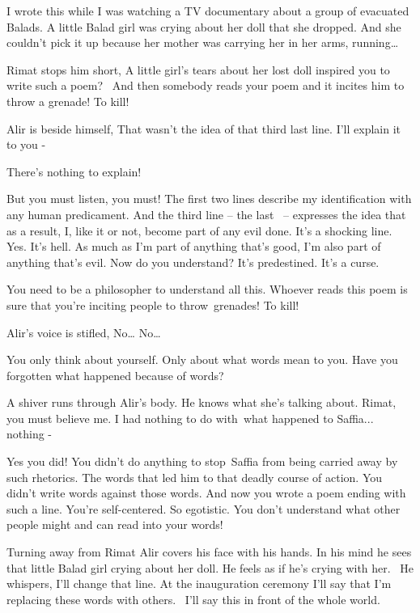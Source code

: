 \documentclass[letterpaper]{article}
\begin{document}
{\textquotedbl}I wrote this while I was watching a TV documentary about a group of evacuated Balads. A little Balad girl
was crying about her doll that she dropped. And she couldn't pick it up because her mother was carrying her in her
arms, running{\dots}{\textquotedbl} 

Rimat stops him short, {\textquotedbl}A little girl's tears about her lost doll inspired you to write such a poem?~ And
then somebody reads your poem and it incites him to throw a grenade! To kill!{\textquotedbl} 

Alir is beside himself, {\textquotedbl}That wasn't the idea of that third last line. I'll explain it to you
-{\textquotedbl} 

{\textquotedbl}There's nothing to explain!{\textquotedbl} 

{\textquotedbl}But you must listen, you must! The first two lines describe my identification with any human predicament.
And the third line -- the last \ {}-- expresses the idea that as a result, I, like it or not, become part of any evil
done. It's a shocking line. Yes. It's hell. As much as I'm part of anything that's good, I'm also part of anything
that's evil. Now do you understand? It's predestined. It's a curse.{\textquotedbl} 

{\textquotedbl}You need to be a philosopher to understand all this. Whoever reads this poem is sure that you're inciting
people to throw~grenades! To kill!{\textquotedbl} 

Alir's voice is stifled, {\textquotedbl}No{\dots} No{\dots}{\textquotedbl} 

{\textquotedbl}You only think about yourself. Only about what words mean to you. Have you forgotten what happened
because of words?{\textquotedbl}

A shiver runs through Alir's body. He knows what she's talking about. {\textquotedbl}Rimat, you must believe me. I had
nothing to do with~what happened to Saffia... nothing - {\textquotedbl} 

{\textquotedbl}Yes you did! You didn't do anything to stop~Saffia from being carried away by such rhetorics. The words
that led him to that deadly course of action. You didn't write words against those words. And now you wrote a poem
ending with such a line. You're self-centered. So egotistic.\textcolor[rgb]{0.8901961,0.42352942,0.039215688}{ }You
don't understand what other people might and can read into your words!{\textquotedbl} 

Turning away from Rimat Alir covers his face with his hands. In his mind he sees that little Balad girl crying about her
doll. He feels as if he's crying with her. ~He whispers, {\textquotedbl}I'll change that line. At the inauguration
ceremony I'll say that I'm replacing these words with others.~ I'll say this in front of the whole
world.{\textquotedbl} 
\end{document}
